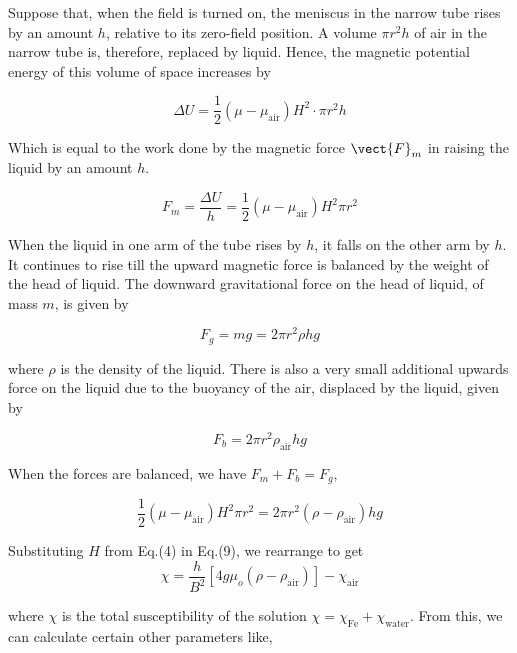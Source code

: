 Suppose that, when the field is turned on, the meniscus in the narrow tube rises by an amount $h$, relative to its zero-field position. A volume $\pi r^2h$ of air in the narrow tube is, therefore, replaced by liquid. Hence, the magnetic potential energy of this volume of space increases by

\begin{equation}
    \Delta U = \frac{1}{2}(\mu-\mu_\text{air})H^2\cdot\pi r^2h
\end{equation}

Which is equal to the work done by the magnetic force $\vect{F}_m$ in raising the liquid by an amount $h$.

\begin{equation}
    F_m = \frac{\Delta U}{h} = \frac{1}{2}(\mu-\mu_\text{air})H^2\pi r^2
\end{equation}

When the liquid in one arm of the tube rises by $h$, it falls on the other arm by $h$. It continues to rise till the upward magnetic force is balanced by the weight of the head of liquid. The downward gravitational force on the head of liquid, of mass $m$, is given by

\begin{equation}
    F_g = mg = 2\pi r^2 \rho h g
\end{equation}

where $\rho$ is the density of the liquid. There is also a very small additional upwards force on the liquid due to the buoyancy of the air, displaced by the liquid, given by

\begin{equation}
    F_b = 2\pi r^2 \rho_\text{air} h g
\end{equation}

When the forces are balanced, we have $F_m + F_b = F_g $, 

\begin{equation}
    \frac{1}{2}(\mu-\mu_\text{air})H^2\pi r^2 = 2\pi r^2 (\rho - \rho_\text{air}) h g
\end{equation}

Substituting $H$ from Eq.(4) in Eq.(9), we rearrange to get
\begin{equation}
    \chi = \frac{h}{B^2}[4g\mu_o(\rho - \rho_\text{air})] - \chi_\text{air}
\end{equation}

where $\chi$ is the total susceptibility of the solution $\chi = \chi_\text{Fe} + \chi_\text{water}$. From this, we can calculate certain other parameters like,

